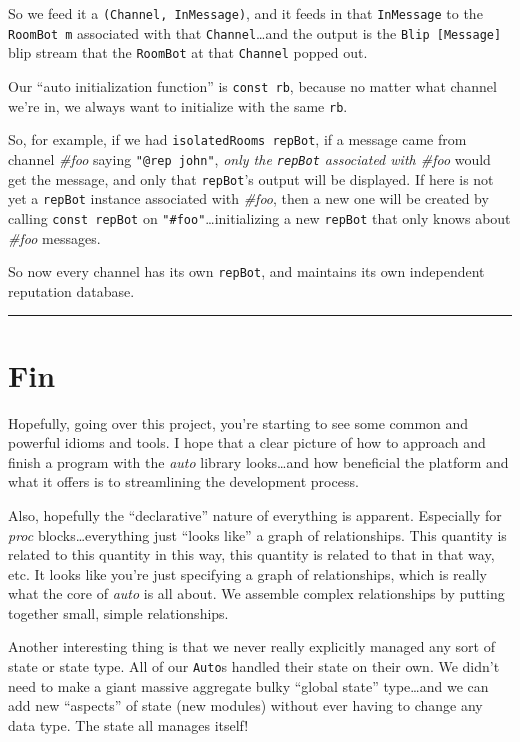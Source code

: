 \documentclass[]{article}
\begin{document}
So we feed it a \texttt{(Channel,\ InMessage)}, and it feeds in that
\texttt{InMessage} to the \texttt{RoomBot\ m} associated with that
\texttt{Channel}\ldots{}and the output is the \texttt{Blip\ {[}Message{]}} blip
stream that the \texttt{RoomBot} at that \texttt{Channel} popped out.

Our ``auto initialization function'' is \texttt{const\ rb}, because no matter
what channel we're in, we always want to initialize with the same \texttt{rb}.

So, for example, if we had \texttt{isolatedRooms\ repBot}, if a message came
from channel \emph{\#foo} saying \texttt{"@rep\ john"}, \emph{only the
\texttt{repBot} associated with \#foo} would get the message, and only that
\texttt{repBot}'s output will be displayed. If here is not yet a \texttt{repBot}
instance associated with \emph{\#foo}, then a new one will be created by calling
\texttt{const\ repBot} on \texttt{"\#foo"}\ldots{}initializing a new
\texttt{repBot} that only knows about \emph{\#foo} messages.

So now every channel has its own \texttt{repBot}, and maintains its own
independent reputation database.

\begin{center}\rule{0.5\linewidth}{\linethickness}\end{center}

\section{Fin}\label{fin}

Hopefully, going over this project, you're starting to see some common and
powerful idioms and tools. I hope that a clear picture of how to approach and
finish a program with the \emph{auto} library looks\ldots{}and how beneficial
the platform and what it offers is to streamlining the development process.

Also, hopefully the ``declarative'' nature of everything is apparent. Especially
for \emph{proc} blocks\ldots{}everything just ``looks like'' a graph of
relationships. This quantity is related to this quantity in this way, this
quantity is related to that in that way, etc. It looks like you're just
specifying a graph of relationships, which is really what the core of
\emph{auto} is all about. We assemble complex relationships by putting together
small, simple relationships.

Another interesting thing is that we never really explicitly managed any sort of
state or state type. All of our \texttt{Auto}s handled their state on their own.
We didn't need to make a giant massive aggregate bulky ``global state''
type\ldots{}and we can add new ``aspects'' of state (new modules) without ever
having to change any data type. The state all manages itself!
\end{document}
